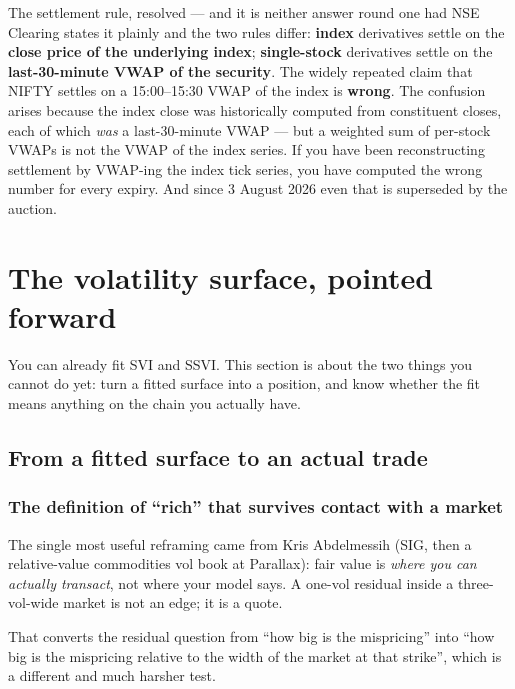 \documentclass[11pt,a4paper]{article}
\begin{document}
\begin{keyfact}{The settlement rule, resolved --- and it is neither answer round one had}
NSE Clearing states it plainly and the two rules differ: \textbf{index}
derivatives settle on the \textbf{close price of the underlying index};
\textbf{single-stock} derivatives settle on the \textbf{last-30-minute VWAP of
the security}. The widely repeated claim that NIFTY settles on a 15:00--15:30
VWAP of the index is \textbf{wrong}. The confusion arises because the index close
was historically computed from constituent closes, each of which \emph{was} a
last-30-minute VWAP --- but a weighted sum of per-stock VWAPs is not the VWAP of
the index series. If you have been reconstructing settlement by VWAP-ing the
index tick series, you have computed the wrong number for every expiry. And since
3 August 2026 even that is superseded by the auction.
\end{keyfact}

\newpage
\section{The volatility surface, pointed forward}
\label{sec:surface}

You can already fit SVI and SSVI. This section is about the two things you cannot
do yet: turn a fitted surface into a position, and know whether the fit means
anything on the chain you actually have.

\subsection{From a fitted surface to an actual trade}

\subsubsection{The definition of ``rich'' that survives contact with a market}

The single most useful reframing came from Kris Abdelmessih (SIG, then a
relative-value commodities vol book at Parallax): fair value is \emph{where you
can actually transact}, not where your model says. A one-vol residual inside a
three-vol-wide market is not an edge; it is a quote.

That converts the residual question from ``how big is the mispricing'' into ``how
big is the mispricing relative to the width of the market at that strike'', which
is a different and much harsher test.
\end{document}

